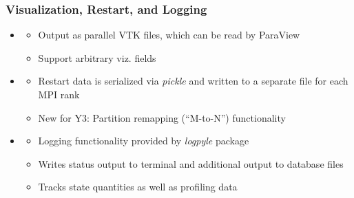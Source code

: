 \begin{frame}[fragile]\frametitle{Visualization, Restart, and Logging}

\begin{itemize}
\item {\large{}}
  \begin{itemize}
  \normalsize
  \item Output as parallel VTK files, which can be read by ParaView
  \item Support arbitrary viz. fields
  \end{itemize}
\item {\large{}}
  \begin{itemize}
  \normalsize
  \item Restart data is serialized via \textit{pickle} and written to a
    separate file for each MPI rank
  \item {\color{myOrange}New for Y3:} Partition remapping (``M-to-N'') functionality 
  \end{itemize}
\item {\large{}}
  \begin{itemize}
  \normalsize
  \item Logging functionality provided by \textit{logpyle} package 
  \item Writes status output to terminal and additional output to database files
  \item Tracks state quantities as well as profiling data
  \end{itemize}
\end{itemize}

\end{frame}
